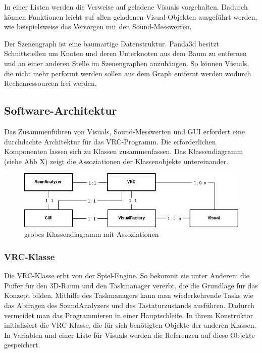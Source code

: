 In einer Listen werden die Verweise auf geladene Visuals vorgehalten. Dadurch k\"onnen Funktionen leicht auf allen
geladenen Visual-Objekten ausgef\"uhrt werden, wie beispielsweise das Versorgen mit den Sound-Messwerten.

Der Szenengraph ist eine baumartige Datenstruktur. Panda3d besitzt Schnittstellen um Knoten und deren Unterknoten
aus dem Baum zu entfernen und an einer anderen Stelle im Szenengraphen anzuh\"angen. So k\"onnen Visuals, die nicht mehr
performt werden sollen aus dem Graph entfernt werden wodurch Rechenressourcen frei werden.

\subsection{Software-Architektur}

Das Zusammenf\"uhren von Visuals, Sound-Messwerten und GUI erfordert eine durchdachte Architektur f\"ur das VRC-Programm.
Die erforderlichen Komponenten lassen sich zu Klassen zusammenfassen. Das Klassendiagramm (siehe Abb X) zeigt die 
Assoziationen der Klassenobjekte untereinander.

\begin{figure}[h!]
    \centering
    \includegraphics[width=1\textwidth]{pictures/classdiagram1.png}
    \caption{grobes Klassendiagramm mit Assoziationen}
\end{figure}

\subsubsection{VRC-Klasse}

Die VRC-Klasse erbt von der Spiel-Engine. So bekommt sie unter Anderem die Puffer f\"ur den 3D-Raum und den Taskmanager 
vererbt, die die Grundlage f\"ur das Konzept bilden. Mithilfe des Taskmanagers kann man wiederkehrende Tasks wie 
das Abfragen des SoundAnalyzers und des Tastaturzustands ausf\"uhren. Dadurch vermeidet man das Programmieren in einer 
Hauptschleife.
In ihrem Konstruktor initialisiert die VRC-Klasse, die f\"ur sich ben\"otigten Objekte der anderen Klassen.
In Variablen und einer Liste f\"ur Visuals werden die Referenzen auf diese Objekte gespeichert.

